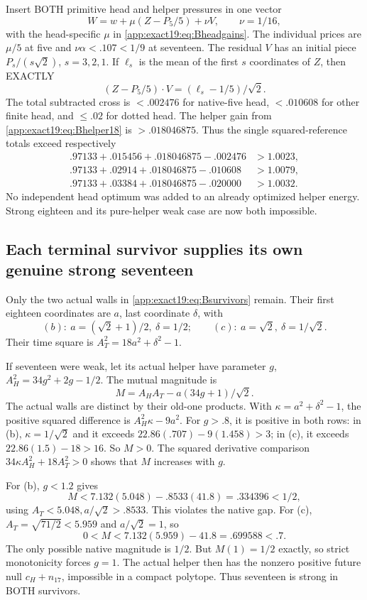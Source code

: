 \documentclass[11pt]{article}
\theoremstyle{definition}
\theoremstyle{remark}
\begin{document}
Insert BOTH primitive head and
helper pressures in one vector
\[
                   W=w+\mu(Z-P_5/5)+\nu V,\qquad\nu=1/16 ,
\]
with the head-specific \(\mu\)
in \eqref{app:exact19:eq:Bheadgains}.
The individual prices are
\(\mu/5\) at five and
\(\nu\alpha<.107<1/9\) at seventeen.
The residual \(V\) has an initial
piece \(P_s/(s\sqrt2)\),
\(s=3,2,1\).
If \(\ell_s\) is the mean of the
first \(s\) coordinates of \(Z\),
then EXACTLY
\[
                         (Z-P_5/5)\cdot V=(\ell_s-1/5)/\sqrt2 .
\]
The total subtracted cross is
\(<.002476\) for native-five head,
\(<.010608\) for other finite head,
and \(\le.02\) for dotted head.
The helper gain from
\eqref{app:exact19:eq:Bhelper18}
is \(>.018046875\).
Thus the single squared-reference
totals exceed respectively
\[
\begin{split}
 .97133+.015456+.018046875-.002476&>1.0023,\\
 .97133+.02914+.018046875-.010608&>1.0079,\\
 .97133+.03384+.018046875-.020000&>1.0032 .
\end{split}
\]
No independent head optimum was
added to an already optimized
helper energy.
Strong eighteen and its pure-helper
weak case are now both impossible.

\subsection{Each terminal survivor supplies its own genuine strong seventeen}
\label{app:exact19:Bsurvivorhead}

Only the two actual walls in
\eqref{app:exact19:eq:Bsurvivors}
remain.
Their first eighteen coordinates
are \(a\), last coordinate
\(\delta\), with
\[
       (b):\ a=(\sqrt2+1)/2,\ \delta=1/2;\qquad
       (c):\ a=\sqrt2,\ \delta=1/\sqrt2 .
\]
Their time square is
\(A_T^2=18a^2+\delta^2-1\).

If seventeen were weak, let its
actual helper have parameter \(g\),
\(A_H^2=34g^2+2g-1/2\).
The mutual magnitude is
\[
                  M=A_HA_T-a(34g+1)/\sqrt2 .
\]
The actual walls are distinct by
their old-one products.
With \(\kappa=a^2+\delta^2-1\),
the positive squared difference
is \(A_H^2\kappa-9a^2\).
For \(g>.8\), it is positive in
both rows: in (b), \(\kappa=1/\sqrt2\)
and it exceeds
\(22.86(.707)-9(1.458)>3\);
in (c), it exceeds
\(22.86(1.5)-18>16\).
So \(M>0\).
The squared derivative comparison
\(34\kappa A_H^2+18A_T^2>0\)
shows that \(M\) increases with \(g\).

For (b), \(g<1.2\) gives
\[
                M<7.132(5.048)-.8533(41.8)
                           =.334396<1/2 ,
\]
using \(A_T<5.048,a/\sqrt2>.8533\).
This violates the native gap.
For (c), \(A_T=\sqrt{71/2}<5.959\)
and \(a/\sqrt2=1\), so
\[
                        0<M<7.132(5.959)-41.8=.699588<.7 .
\]
The only possible native magnitude
is \(1/2\).
But \(M(1)=1/2\) exactly, so strict
monotonicity forces \(g=1\).
The actual helper then has the
nonzero positive future null
\(c_H+n_{17}\), impossible in a
compact polytope.
Thus seventeen is strong in BOTH
survivors.
\end{document}
